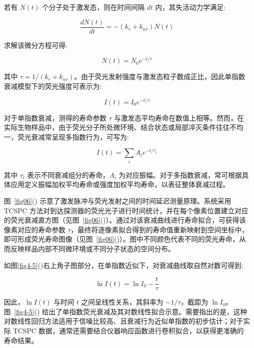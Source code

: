 若有 $N(t)$ 个分子处于激发态，则在时间间隔 $dt$ 内，其失活动力学满足:

\begin{equation}
  \frac{dN(t)}{dt}=-(k_r+k_{nr})N(t)
\end{equation}

求解该微分方程可得:

\begin{equation}
  N(t)=N_0 e^{-t/\tau}
\end{equation}

其中 $\tau=1/(k_r+k_{nr})$。由于荧光发射强度与激发态粒子数成正比，因此单指数衰减模型下的荧光强度可表示为:

\begin{equation}
  I(t)=I_0 e^{-t/\tau}
\end{equation}

对于单指数衰减，测得的寿命参数 $\tau$ 与激发态平均寿命在数值上相等。然而，在实际生物样品中，由于荧光分子所处微环境、结合状态或局部淬灭条件往往不均一，荧光衰减常呈现多指数行为，可写为:

\begin{equation}
  I(t)=\sum_i A_i e^{-t/\tau_i}
\end{equation}

其中 $\tau_i$ 表示不同衰减组分的寿命，$A_i$ 为对应振幅。对于多指数衰减，常可根据具体应用定义振幅加权平均寿命或强度加权平均寿命，以表征整体衰减过程。

图~\ref{fig06}() 示意了激发脉冲与荧光发射之间的时间延迟测量原理。系统采用 TCSPC 方法对到达探测器的荧光光子进行时间统计，并在每个像素位置建立对应的荧光衰减直方图（见图~\ref{fig06}()）。通过对该衰减曲线进行寿命拟合，可获得该像素对应的寿命参数 $\tau$，最终将逐像素拟合得到的寿命值重新映射到空间坐标中，即可形成荧光寿命图像（见图~\ref{fig06}()）。图中不同颜色代表不同的荧光寿命，从而反映样品内部不同微环境或不同分子状态的空间分布。

如图\ref{fig4-5}()右上角子图部分，在单指数近似下，对衰减曲线取自然对数可得到:

\begin{equation}
  \ln I(t)=\ln I_0-\frac{t}{\tau}
\end{equation}

因此，$\ln I(t)$ 与时间 $t$ 之间呈线性关系，其斜率为 $-1/\tau$，截距为 $\ln I_0$。图~\ref{fig4-5}() 给出了单指数荧光衰减及其对数线性拟合示意。需要指出的是，这种对数线性回归方法适用于信噪比较高、且衰减行为近似单指数的初步估计；对于实际 TCSPC 数据，通常还需要结合仪器响应函数进行卷积拟合，以获得更准确的寿命结果。




